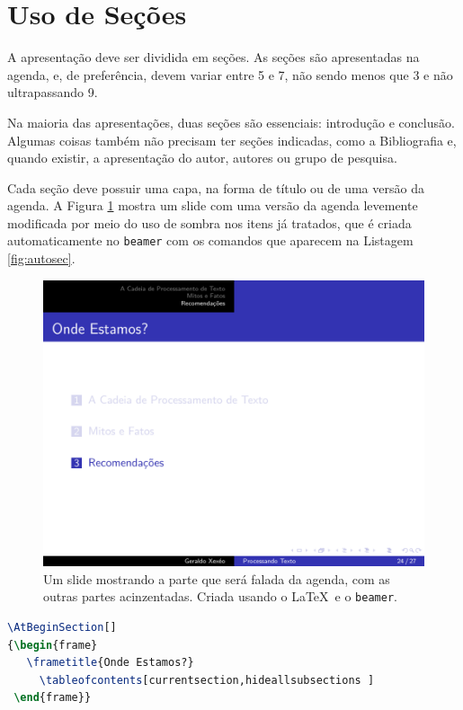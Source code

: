 \section{Uso de Seções}

A apresentação deve ser dividida em seções. As seções são apresentadas na agenda, e, de preferência, devem variar entre 5 e 7, não sendo menos que 3 e não ultrapassando 9.

Na maioria das apresentações, duas seções são essenciais: introdução e conclusão. Algumas coisas também não precisam ter seções indicadas, como a Bibliografia e, quando existir, a apresentação do autor, autores ou grupo de pesquisa.

Cada seção deve possuir uma capa, na forma de título ou de uma versão da agenda. A Figura \ref{fig:meio} mostra um slide com uma versão da agenda levemente modificada por meio do uso de sombra nos itens já tratados, que é criada automaticamente no \texttt{beamer} com os comandos que aparecem na Listagem \ref{fig:autosec}.

\begin{figure}[hb]
    \centering
    \includegraphics[width=\tam\linewidth,frame]{imagens/agendadomeio.png}
    \caption{Um slide mostrando a parte que será falada da agenda, com as outras partes acinzentadas. Criada usando o \LaTeX\  e o \texttt{beamer}.}
    \label{fig:meio}
\end{figure}

\begin{lstlisting}[language=TeX,caption={Comando para títulos de seção automáticos no \texttt{beamer} com o tema Luebeck.},label={lst:autosec}]
\AtBeginSection[]
{\begin{frame}
   \frametitle{Onde Estamos?}
     \tableofcontents[currentsection,hideallsubsections ]
 \end{frame}}
\end{lstlisting}

